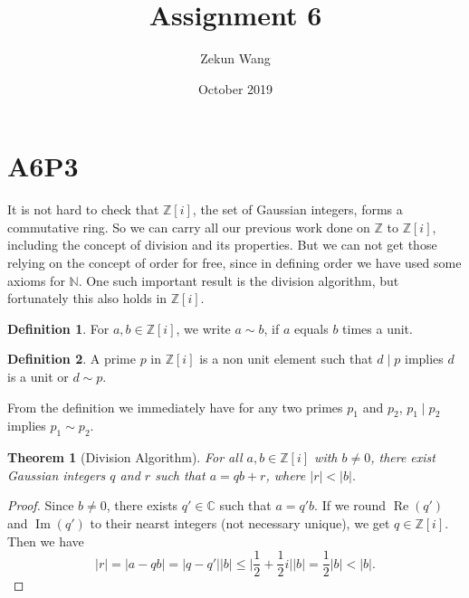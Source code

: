 \documentclass{article}
\title{Assignment 6}
\author{Zekun Wang}
\date{October 2019}
\begin{document}
\newtheorem{theorem}{Theorem}[section]

\newtheorem{lemma}[theorem]{Lemma}
\newtheorem{conjecture}[theorem]{Conjecture}
\newtheorem{corollary}{Corollary}[theorem]

\theoremstyle{definition}
\newtheorem{definition}{Definition}[section]
\newtheorem{example}{Example}[theorem]

\maketitle

\section{A6P3}
It is not hard to check that $\mathbb{Z}[i]$, the set of Gaussian integers, forms a commutative ring. So we can carry all our previous work done on $\mathbb{Z}$ to $\mathbb{Z}[i]$, including the concept of division and its properties.  But we can not get those relying on the concept of order for free, since in defining order we have used some axioms for $\mathbb{N}$. One such important result is the division algorithm, but fortunately this also holds in $\mathbb{Z}[i]$.

\begin{definition}
For $a,b \in \mathbb{Z}[i]$, we write $a \sim b$, if $a$ equals $b$ times a unit.
\end{definition}
\begin{definition}
A prime $p$ in $\mathbb{Z}[i]$ is a non unit element such that $d\mid p$ implies $d$ is a unit or $d \sim p$.
\end{definition}
From the definition we immediately have for any two primes $p_1$ and $p_2$, $p_1 \mid p_2$ implies $p_1 \sim p_2$.
\begin{theorem}[Division Algorithm]
For all $a,b \in \mathbb{Z}[i]$ with $b \not = 0$, there exist Gaussian integers $q$ and $r$ such that $a = qb+r$, where $\vert r \vert < \vert b \vert.$
\end{theorem}

\begin{proof}
Since $b \not = 0$, there exists $q' \in \mathbb{C}$ such that $a = q'b$. If we round $\operatorname{Re}(q')$ and $\operatorname{Im}(q')$ to their nearst integers (not necessary unique), we get $q \in \mathbb{Z}[i]$. Then we have 
$$\vert r \vert = \vert a - qb \vert  = \vert q - q' \vert \vert b \vert \leq \vert \frac{1}{2}+\frac{1}{2}i\vert\vert b\vert = \frac{1}{2}\vert b \vert < \vert b \vert.$$
\end{proof}
\end{document}
